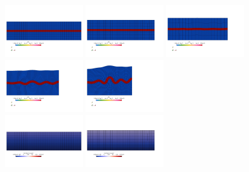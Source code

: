 \begin{center}
\includegraphics[width=3.4cm]{python_codes/fieldstone_129/results/experiment1/eta0000}
\includegraphics[width=3.4cm]{python_codes/fieldstone_129/results/experiment1/eta0099}
\includegraphics[width=3.4cm]{python_codes/fieldstone_129/results/experiment1/eta0199}
\includegraphics[width=3.4cm]{python_codes/fieldstone_129/results/experiment1/eta0299}
\includegraphics[width=3.4cm]{python_codes/fieldstone_129/results/experiment1/eta0399}\\
\includegraphics[width=3.4cm]{python_codes/fieldstone_129/results/experiment1/vel0000}
\includegraphics[width=3.4cm]{python_codes/fieldstone_129/results/experiment1/vel0099}

\end{center}
